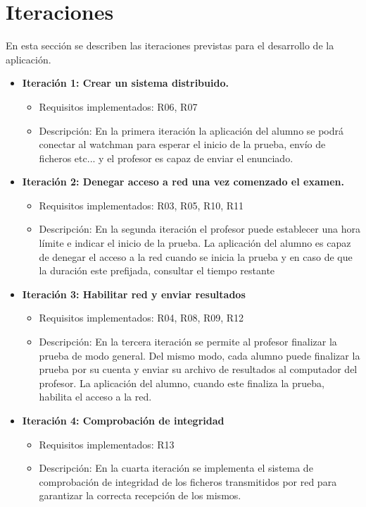 \section{Iteraciones}

En esta sección se describen las iteraciones previstas para el desarrollo de la aplicación.

\begin{itemize}
    \item {\bfseries Iteración 1: Crear un sistema distribuido.}
    \begin{itemize}
        \item Requisitos implementados: R06, R07
        \item Descripción: En la primera iteración la aplicación del alumno se podrá conectar al watchman para esperar el inicio de la prueba, envío de ficheros etc... y el profesor es capaz de enviar el enunciado.
    \end{itemize}

    \item {\bfseries Iteración 2: Denegar acceso a red una vez comenzado el examen.}
    \begin{itemize}
        \item Requisitos implementados: R03, R05, R10, R11
        \item Descripción: En la segunda iteración el profesor puede establecer una hora límite e indicar el inicio de la prueba. La aplicación del alumno es capaz de denegar el acceso a la red cuando se inicia la prueba y en caso de que la duración este prefijada, consultar el tiempo restante
    \end{itemize}


    \item {\bfseries Iteración 3: Habilitar red y enviar resultados}
    \begin{itemize}
        \item Requisitos implementados: R04, R08, R09, R12
        \item Descripción: En la tercera iteración se permite al profesor finalizar la prueba de modo general. Del mismo modo, cada alumno puede finalizar la prueba por su cuenta y enviar su archivo de resultados al computador del profesor. La aplicación del alumno, cuando este finaliza la prueba, habilita el acceso a la red.
    \end{itemize}


    \item {\bfseries Iteración 4: Comprobación de integridad}
    \begin{itemize}
        \item Requisitos implementados: R13
        \item Descripción: En la cuarta iteración se implementa el sistema de comprobación de integridad de los ficheros transmitidos por red para garantizar la correcta recepción de los mismos.
    \end{itemize}


\end{itemize}
